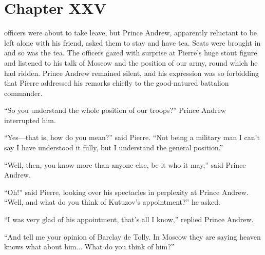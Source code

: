 
\chapter*{Chapter XXV} \ifaudio {}
\fi

 officers were about to take leave, but Prince Andrew,
apparently reluctant to be left alone with his friend, asked them
to stay and have tea. Seats were brought in and so was the
tea. The officers gazed with surprise at Pierre's huge stout
figure and listened to his talk of Moscow and the position of our
army, round which he had ridden. Prince Andrew remained silent,
and his expression was so forbidding that Pierre addressed his
remarks chiefly to the good-natured battalion commander.

``So you understand the whole position of our troops?'' Prince
Andrew interrupted him.

``Yes---that is, how do you mean?'' said Pierre. ``Not being a
military man I can't say I have understood it fully, but I
understand the general position.''

``Well, then, you know more than anyone else, be it who it may,''
said Prince Andrew.

``Oh!'' said Pierre, looking over his spectacles in perplexity at
Prince Andrew. ``Well, and what do you think of Kutuzov's
appointment?'' he asked.

``I was very glad of his appointment, that's all I know,''
replied Prince Andrew.

``And tell me your opinion of Barclay de Tolly. In Moscow they
are saying heaven knows what about him... What do you think of
him?''

